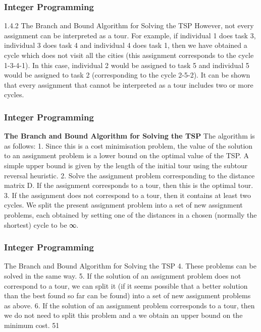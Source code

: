 \begin{frame}
\frametitle{Integer Programming}     
1.4.2 The Branch and Bound Algorithm for Solving the
TSP
However, not every assignment can be interpreted as a tour. For
example, if individual 1 does task 3, individual 3 does task 4 and
individual 4 does task 1, then we have obtained a cycle which does
not visit all the cities (this assignment corresponds to the cycle
1-3-4-1).
In this case, individual 2 would be assigned to task 5 and individual
5 would be assigned to task 2 (corresponding to the cycle 2-5-2).
It can be shown that every assignment that cannot be interpreted
as a tour includes two or more cycles.
\end{frame}  
\begin{frame} 
\frametitle{Integer Programming}     
\noindent \textbf{
The Branch and Bound Algorithm for Solving the TSP}
The algorithm is as follows:
1. Since this is a cost minimisation problem, the value
of the solution to an assignment problem is a lower
bound on the optimal value of the TSP. A simple
upper bound is given by the length of the initial tour
using the subtour reversal heuristic.
2. Solve the assignment problem corresponding to the
distance matrix D. If the assignment corresponds to
a tour, then this is the optimal tour.
3. If the assignment does not correspond to a tour, then
it contains at least two cycles. We split the present
assignment problem into a set of new assignment
problems, each obtained by setting one of the
distances in a chosen (normally the shortest) cycle to
be ∞.
\end{frame}  
\begin{frame}
\frametitle{Integer Programming}     
The Branch and Bound Algorithm for Solving the TSP
4. These problems can be solved in the same way.
5. If the solution of an assignment problem does not
correspond to a tour, we can split it (if it seems
possible that a better solution than the best found so
far can be found) into a set of new assignment
problems as above.
6. If the solution of an assignment problem corresponds
to a tour, then we do not need to split this problem
and a we obtain an upper bound on the minimum
cost.
51 
\end{frame}  
